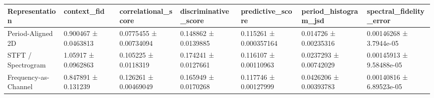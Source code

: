 \begin{tabular}{lllllll}
\toprule
      Representation &          context\_fid &    correlational\_score & discriminative\_score &       predictive\_score &   period\_histogram\_jsd &  spectral\_fidelity\_error \\
\midrule
   Period-Aligned 2D & 0.900467 ± 0.0463813 & 0.0775455 ± 0.00734094 & 0.148862 ± 0.0139885 & 0.115261 ± 0.000357164 &  0.014726 ± 0.00235316 &  0.00146268 ± 3.7944e-05 \\
  STFT / Spectrogram &  1.05917 ± 0.0962863 &   0.105225 ± 0.0118319 & 0.174241 ± 0.0127661 &  0.116107 ± 0.00110963 & 0.0237293 ± 0.00742029 & 0.00145913 ± 9.58488e-05 \\
Frequency-as-Channel &  0.847891 ± 0.131239 &  0.126261 ± 0.00469049 & 0.165949 ± 0.0170268 &  0.117746 ± 0.00127999 & 0.0426206 ± 0.00393783 & 0.00140816 ± 6.89523e-05 \\
\bottomrule
\end{tabular}

